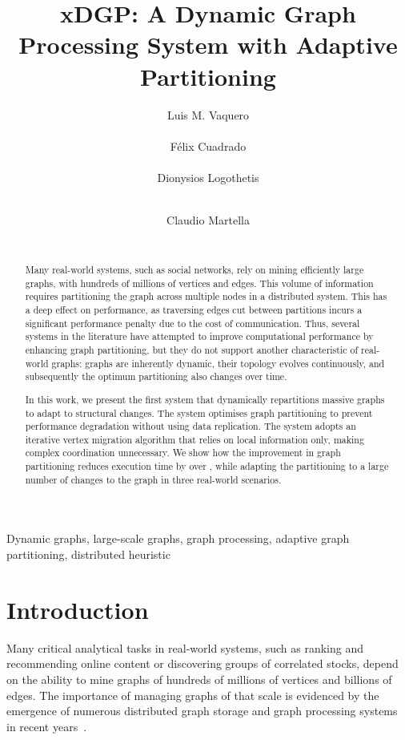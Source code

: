 \documentclass{sig-alternate-10pt}
\title{xDGP: A Dynamic Graph Processing System with Adaptive Partitioning}
\author{
\alignauthor Luis M. Vaquero\\
           \affaddr{Queen Mary University of London} \\
           \email{luis.vaquero@ieee.org}
\alignauthor F\'{e}lix Cuadrado\\
           \affaddr{Queen Mary University of London}\\
          \email{felix@eecs.qmul.ac.uk}
\alignauthor Dionysios Logothetis\\
           \affaddr{Telefonica Research}\\
           \email{dl@tid.es}
\and
\alignauthor Claudio Martella\\
           \affaddr{VU University Amsterdam}\\
           \email{c.martella@vu.nl}
}
\begin{document}
\maketitle

\begin{abstract}
Many real-world systems, such as social networks, rely on mining efficiently large graphs, with hundreds of millions of vertices and edges. This volume of information requires partitioning the graph across multiple nodes in a distributed system. This has a deep effect on performance, as traversing edges cut between partitions incurs a significant performance penalty due to the cost of communication. Thus, several systems in the literature have attempted to improve computational performance by enhancing graph partitioning, but they do not support another characteristic of real-world graphs: graphs are inherently dynamic, their topology evolves continuously, and subsequently the optimum partitioning also changes over time.


In this work, we present the first system that dynamically repartitions massive graphs to adapt to structural changes. The system optimises graph partitioning to prevent performance degradation without using data replication. The system adopts an iterative vertex migration algorithm that relies on local information only, making complex coordination unnecessary. We show how the improvement in graph partitioning reduces execution time by over , while adapting the partitioning to a large number of changes to the graph in three real-world scenarios.

\end{abstract}


\keywords
Dynamic graphs, large-scale graphs, graph processing, adaptive graph partitioning, distributed heuristic

\section{Introduction}

Many critical analytical tasks in real-world
systems, such as ranking and recommending online content or discovering groups of
correlated stocks, depend on the ability to mine graphs
of hundreds of millions of vertices and billions of edges. The importance of managing
graphs of that scale is evidenced by the emergence of  numerous distributed
graph storage and graph processing systems in recent years~\cite{
Cheng2012, Power:2010:PBF:1924943.1924964, giraph, trinity,
Seo:2010:HEM:1931470.1931872, low2010, Krepska2011, Stutz2010}.
\end{document}
